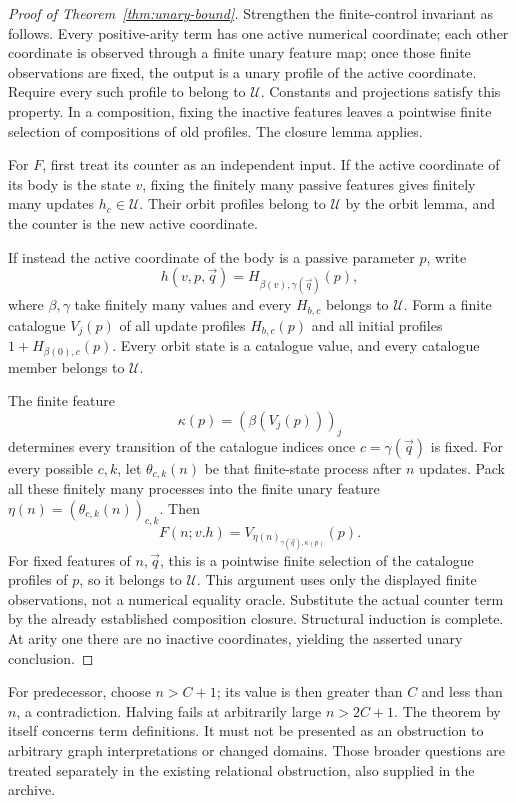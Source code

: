 \begin{proof}[Proof of Theorem~\ref{thm:unary-bound}]
Strengthen the finite-control invariant as follows. Every positive-arity
term has one active numerical coordinate; each other coordinate is observed
through a finite unary feature map; once those finite observations are fixed,
the output is a unary profile of the active coordinate. Require every such
profile to belong to $\mathcal U$. Constants and projections satisfy this
property. In a composition, fixing the inactive features leaves a pointwise
finite selection of compositions of old profiles. The closure lemma applies.

For $F$, first treat its counter as an independent input. If the active
coordinate of its body is the state $v$, fixing the finitely many passive
features gives finitely many updates $h_c\in\mathcal U$. Their orbit profiles
belong to $\mathcal U$ by the orbit lemma, and the counter is the new active
coordinate.

If instead the active coordinate of the body is a passive parameter $p$,
write
\[
 h(v,p,\vec q)=H_{\beta(v),\gamma(\vec q)}(p),
\]
where $\beta,\gamma$ take finitely many values and every $H_{b,c}$ belongs
to $\mathcal U$. Form a finite catalogue $V_j(p)$ of all update profiles
$H_{b,c}(p)$ and all initial profiles $1+H_{\beta(0),c}(p)$. Every orbit
state is a catalogue value, and every catalogue member belongs to
$\mathcal U$.

The finite feature
\[
 \kappa(p)=(\beta(V_j(p)))_j
\]
determines every transition of the catalogue indices once
$c=\gamma(\vec q)$ is fixed. For every possible $c,k$, let
$\theta_{c,k}(n)$ be that finite-state process after $n$ updates. Pack all
these finitely many processes into the finite unary feature
$\eta(n)=(\theta_{c,k}(n))_{c,k}$. Then
\[
 F(n;v.h)=V_{\eta(n)_{\gamma(\vec q),\kappa(p)}}(p).
\]
For fixed features of $n,\vec q$, this is a pointwise finite selection of
the catalogue profiles of $p$, so it belongs to $\mathcal U$. This argument
uses only the displayed finite observations, not a numerical equality
oracle. Substitute the actual counter term by the already established
composition closure. Structural induction is complete. At arity one there
are no inactive coordinates, yielding the asserted unary conclusion.
\end{proof}

For predecessor, choose $n>C+1$; its value is then greater than $C$ and less
than $n$, a contradiction. Halving fails at arbitrarily large $n>2C+1$.
The theorem by itself concerns term definitions. It must not be presented
as an obstruction to arbitrary graph interpretations or changed domains.
Those broader questions are treated separately in the existing relational
obstruction, also supplied in the archive.

